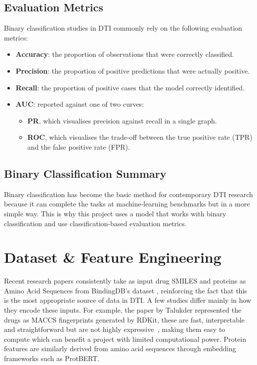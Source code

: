 \subsection{Evaluation Metrics}
Binary classification studies in DTI \citep{DeepLearning, Talukder2025, Ozturk2018} commonly rely on the following evaluation metrics:
\begin{itemize}
    \item \textbf{Accuracy}: the proportion of observations that were correctly classified.
    \item \textbf{Precision}: the proportion of positive predictions that were actually positive.
    \item \textbf{Recall}: the proportion of positive cases that the model correctly identified.
    \item \textbf{AUC}: reported against one of two curves:
    \begin{itemize}
        \item \textbf{PR}, which visualises precision against recall in a single graph.
        \item \textbf{ROC}, which visualises the trade-off between the true positive rate (TPR) and the false positive rate (FPR).
    \end{itemize}
\end{itemize}

\subsection{Binary Classification Summary}
Binary classification has become the basic method for contemporary DTI research because it can complete the tasks at machine-learning benchmarks but in a more simple way.
This is why this project uses a model that works with binary classification and use classification-based evaluation metrics.

\section{Dataset \& Feature Engineering}
Recent research papers consistently take as input drug SMILES and proteins as Amino Acid Sequences from BindingDB's dataset \citep{Vefghi2025}, reinforcing the fact that this is the most appropriate source of data in DTI.
A few studies differ mainly in how they encode these inputs.
For example, the paper by Talukder \citep{Talukder2025} represented the drugs as MACCS fingerprints generated by RDKit, these are fast, interpretable and straightforward but are not highly expressive~\citep{Xie2020}, making them easy to compute which can benefit a project with limited computational power.
Protein features are similarly derived from amino acid sequences through embedding frameworks such as ProtBERT.

